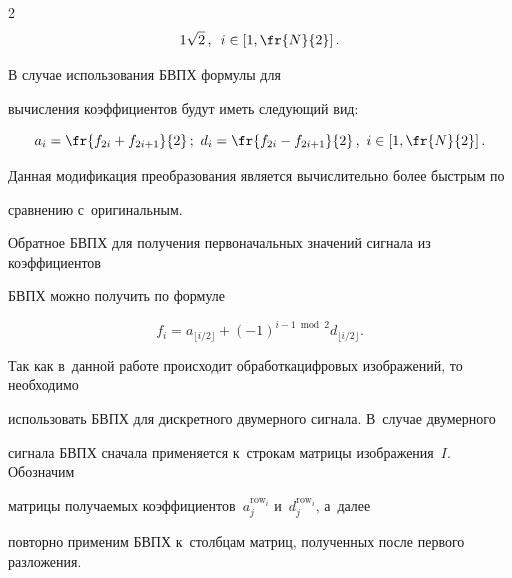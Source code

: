 \begin{multicols}{2}
\begin{equation*}
{{1}}{\sqrt{2}}\,,\enskip  i \in \left[1, \fr{N}{2}\right].


\end{equation*}





В случае использования БВПХ формулы для 


вычисления коэффициентов будут иметь сле\-ду\-ющий вид:


\begin{equation*}


\label{eq:fast_haar}


a_{i} = \fr{f_{2i} + f_{2i + 1}}{2}\,;\ d_{i} = \fr{f_{2i} - f_{2i + 1}}{2}\,,\ 


i \in \left[1, \fr{N}{2}\right].


\end{equation*}


%


Данная модификация преобразования является вычислительно более быстрым по 


сравнению с~оригинальным.





Обратное БВПХ для получения первоначальных значений сигнала из коэффициентов 


БВПХ можно получить по формуле


\begin{equation*}


\label{eq:inv_fast_haar}


f_{i} = a_{\lfloor {i}/{2}\rfloor} + (-1)^{i - 1 \bmod{2}} 


d_{\lfloor {i}/{2}\rfloor}.


\end{equation*}





Так как в~данной работе происходит обработка\linebreak цифровых изображений, то необходимо 


использовать БВПХ для дискретного двумерного сигнала. В~случае двумерного 


сигнала БВПХ \mbox{сначала} применяется к~строкам матрицы изображения~$I$. Обозначим 


матрицы получаемых коэффициентов~$a_j^{\mathrm{row}_i}$ и~$d_{j}^{\mathrm{row}_i}$, а~далее 


повторно применим БВПХ к~столбцам матриц, полученных после первого разложения. 



\end{multicols}
